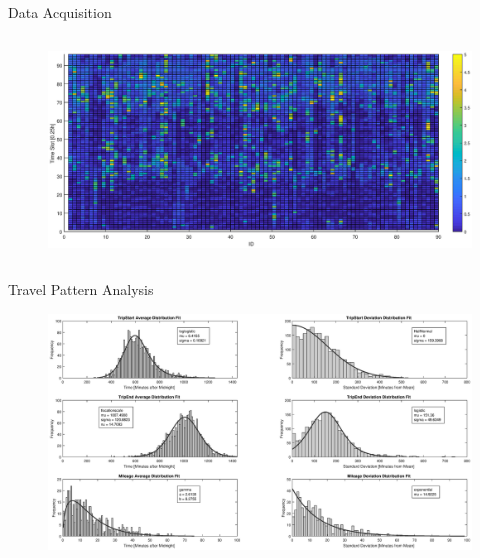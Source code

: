 \documentclass[handout]{beamer}
\begin{document}
\begin{frame}{Data Acquisition}
\begin{columns}
\begin{column}{5.5cm}
			\begin{figure}
				\includegraphics[trim={3cm 0.7cm 3cm 1cm},clip,scale = 0.18]{crest.eps}
			\end{figure}
		\end{column}
	\end{columns}
\end{frame}

\begin{frame}{Travel Pattern Analysis}
	\begin{figure}
		\includegraphics[trim={5.3cm 0cm 5.3cm 0cm},clip,scale = 0.28]{travelpatterns.eps}
	\end{figure}		
\end{frame}
\end{document}
